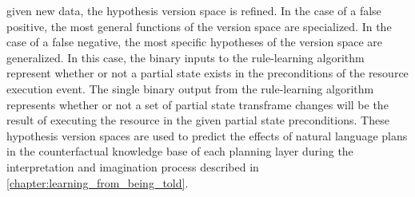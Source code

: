 given new data, the hypothesis version space is refined.  In the case
of a false positive, the most general functions of the version space
are specialized.  In the case of a false negative, the most specific
hypotheses of the version space are generalized.  In this case, the
binary inputs to the rule-learning algorithm represent whether or not
a partial state exists in the preconditions of the resource execution
event.  The single binary output from the rule-learning algorithm
represents whether or not a set of partial state transframe changes
will be the result of executing the resource in the given partial
state preconditions.  These hypothesis version spaces are used to
predict the effects of natural language plans in the counterfactual
knowledge base of each planning layer during the interpretation and
imagination process described in
{\mbox{\autoref{chapter:learning_from_being_told}}}.

